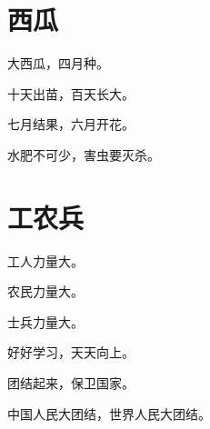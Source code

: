 \documentclass[12pt,UTF-8,openany]{ctexbook}
\begin{document}
\hanzibox{}\hanzibox{}\hanzibox{}\hanzibox{}\hspace{1em}




\chapter{西瓜}

\begin{large}
    
    大西瓜，四月种。
    
    十天出苗，百天长大。
    
    七月结果，六月开花。
    
    水肥不可少，害虫要灭杀。
    
\end{large}


\clearpage

\begin{center}
    
\end{center}


\hanzibox{}\hanzibox{}\hanzibox{}\hanzibox{}\hspace{1em}\hanzibox{}\hanzibox{}\hanzibox{}\hanzibox{}

\hanzibox{}\hanzibox{}\hanzibox{}\hanzibox{}\hspace{1em}\hanzibox{}\hanzibox{}\hanzibox{}\hanzibox{}

\hanzibox{}\hanzibox{}\hanzibox{}\hanzibox{}\hspace{1em}\hanzibox{}\hanzibox{}\hanzibox{}\hanzibox{}






\chapter{工农兵}

\begin{large}
    
    工人力量大。
    
    农民力量大。
    
    士兵力量大。
    
    好好学习，天天向上。
    
    团结起来，保卫国家。
    
    中国人民大团结，世界人民大团结。
    
\end{large}
\end{document}
